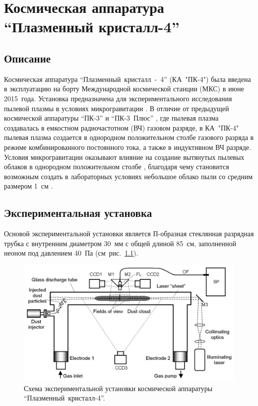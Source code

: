 \chapter{Космическая аппаратура “Плазменный кристалл-4”}
\label{cha:ch_3}
\section{Описание}
\label{sec:sec_31}
Космическая аппаратура “Плазменный~кристалл~-~4” (КА~"ПК-4") была введена в эксплуатацию на борту
Международной космической станции (МКС) в июне 2015~года. Установка предназначена для экспериментального
исследования пылевой плазмы в условиях микрогравитации \cite{Pustylnik}. В отличие от предыдущей космической аппаратуры
“ПК-3” \cite{Nefedov} и “ПК-3~Плюс” \cite{Thomas}, где пылевая плазма создавалась в емкостном радиочастотном (ВЧ) газовом разряде,
в КА~"ПК-4" пылевая плазма создается в однородном положительном столбе газового разряда в режиме
комбинированного постоянного тока, а также в индуктивном ВЧ разряде. Условия микрогравитации оказывают
влияние на создание вытянутых пылевых облаков в однородном положительном столбе \cite{Usachev},
благодаря чему становится возможным создать в лабораторных условиях небольшое облако пыли со средним размером 1~см \cite{Fortov}.

\section{Экспериментальная установка}
Основой экспериментальной установки является П-образная стеклянная разрядная трубка с внутренним диаметром 30~мм
с общей длиной 85~см, заполненной неоном под давлением 40~Па (см~рис.~\ref{fig:fig31}).

\begin{figure}
  \centering
  \includegraphics[width=12cm]{figures/fig31}
  \caption{Схема экспериментальной установки космической аппаратуры “Плазменный~кристалл-4”.}
  \label{fig:fig31}
\end{figure}

